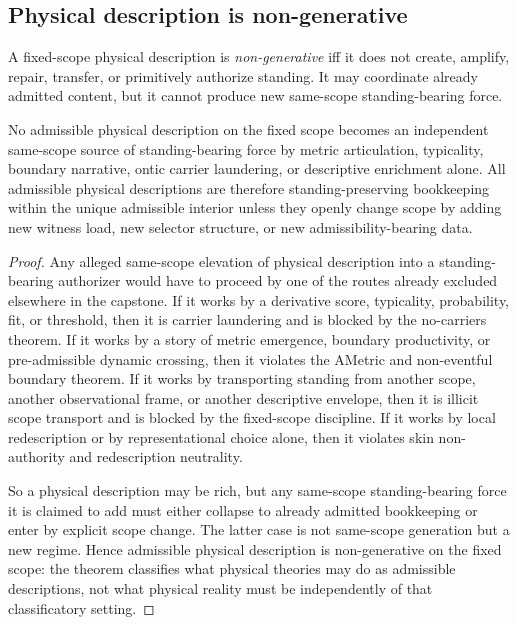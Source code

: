 \subsection{Physical description is non-generative}

\begin{definition}
A fixed-scope physical description is \emph{non-generative} iff it does not create, amplify, repair, transfer, or primitively authorize standing. It may coordinate already admitted content, but it cannot produce new same-scope standing-bearing force.
\end{definition}

\begin{theorem}
\label{thm:physical-non-generativity}
No admissible physical description on the fixed scope becomes an independent same-scope source of standing-bearing force by metric articulation, typicality, boundary narrative, ontic carrier laundering, or descriptive enrichment alone. All admissible physical descriptions are therefore standing-preserving bookkeeping within the unique admissible interior unless they openly change scope by adding new witness load, new selector structure, or new admissibility-bearing data.
\end{theorem}

\begin{proof}
Any alleged same-scope elevation of physical description into a standing-bearing authorizer would have to proceed by one of the routes already excluded elsewhere in the capstone. If it works by a derivative score, typicality, probability, fit, or threshold, then it is carrier laundering and is blocked by the no-carriers theorem. If it works by a story of metric emergence, boundary productivity, or pre-admissible dynamic crossing, then it violates the AMetric and non-eventful boundary theorem. If it works by transporting standing from another scope, another observational frame, or another descriptive envelope, then it is illicit scope transport and is blocked by the fixed-scope discipline. If it works by local redescription or by representational choice alone, then it violates skin non-authority and redescription neutrality.

So a physical description may be rich, but any same-scope standing-bearing force it is claimed to add must either collapse to already admitted bookkeeping or enter by explicit scope change. The latter case is not same-scope generation but a new regime. Hence admissible physical description is non-generative on the fixed scope: the theorem classifies what physical theories may do as admissible descriptions, not what physical reality must be independently of that classificatory setting.
\end{proof}


